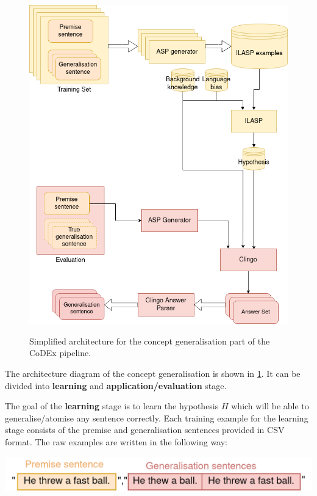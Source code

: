 \begin{figure}[h]
\caption{Simplified architecture for the concept generalisation part of the CoDEx pipeline.} 
\centering
\includegraphics[width=\textwidth]{implementation/simplified architecture diagram.png}
\label{generalisation-architecture-diagram}
\end{figure}


The architecture diagram of the concept generalisation is shown in \ref{generalisation-architecture-diagram}.
It can be divided into \textbf{learning} and \textbf{application/evaluation} stage.

The goal of the \textbf{learning} stage is to learn the hypothesis $H$ which will be able to generalise/atomise any sentence correctly.
Each training example for the learning stage consists of the premise and generalisation sentences provided in CSV format.
The raw examples are written in the following way:
\begin{center}
\setlength\parskip{0pt}
\includegraphics[width=.8\linewidth]{implementation/raw-generalisation-example.png}
\end{center}

